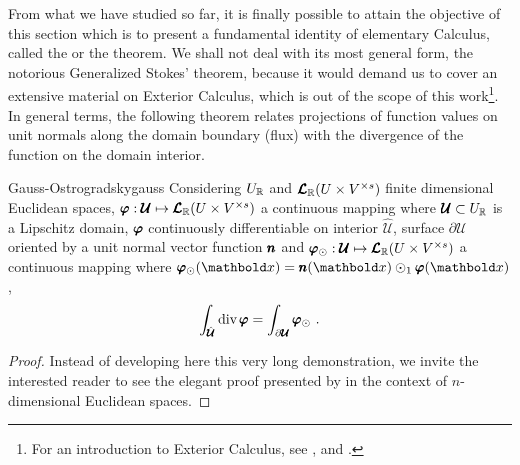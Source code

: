 From what we have studied so far, it is finally possible to attain the objective of this section which is to present a fundamental identity of elementary Calculus, called the  or the  theorem. We shall not deal with its most general form, the notorious Generalized Stokes' theorem, because it would demand us to cover an extensive material on Exterior Calculus, which is out of the scope of this work\footnote{For an introduction to Exterior Calculus, see \cite{flanders_1989_1}, \cite{loomis_2014_1}  and \cite{spivak_1965_1}.}. In general terms, the following theorem relates projections of function values on unit normals along the domain boundary (flux) with the divergence of the function on the domain interior.

\begin{mteo}{Gauss-Ostrogradsky}{gauss}
Considering $U_{\mathbb{R}}$ and $\pmb{\mathcal{L}}_{\mathbb{R}}(U\times V^{\times s})$ finite dimensional Euclidean spaces, $\pmb{\varphi} : \pmb{\mathcal{U}} \mapsto \pmb{\mathcal{L}}_{\mathbb{R}}(U\times V^{\times s})$ a continuous mapping where $\pmb{\mathcal{U}}\subset U_{\mathbb{R}}$ is a Lipschitz domain, $\pmb{\varphi}$ continuously differentiable on interior $\hat{\pmb{\mathcal{U}}}$, surface $\partial\pmb{\mathcal{U}}$ oriented by a unit normal vector function $\pmb{n}$ and
$\pmb{\varphi}_\odot : \pmb{\mathcal{U}} \mapsto \pmb{\mathcal{L}}_{\mathbb{R}}(U\times V^{\times s})$ a continuous mapping
where $\fua{\vtf{\varphi}_\odot}{\vto{x}}=\fua{\vtf{n}}{\vto{x}}\odot_1\fua{\vtf{\varphi}}{\vto{x}}$,
\begin{equation*}
\int_{\hat{\pmb{\mathcal{U}}}}\operatorname{div}{\pmb{\varphi}} = \int_{\partial{\pmb{\mathcal{U}}}}\pmb{\varphi}_\odot\,\,.
\end{equation*}
\end{mteo}
\hspace{1pt}
{\footnotesize
\begin{proof}
Instead of developing here this very long demonstration, we invite the interested reader to see the elegant proof presented by \cite{figueiredo_1964_1} in the context of $n$-dimensional Euclidean spaces.
\end{proof}
}

